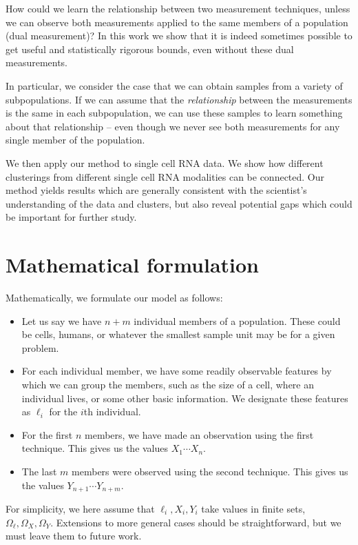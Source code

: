 How could we learn the relationship between two measurement techniques, unless we can observe both measurements 
applied to the same members of a population (dual measurement)?  In this work we show that it is indeed 
sometimes possible to get useful and statistically rigorous bounds, even without these dual measurements.   

In particular, we consider the case that we can obtain samples from a variety of subpopulations.  
If we can assume that the \emph{relationship} between the measurements is the same in each subpopulation, 
we can use these samples to learn something about that relationship -- even though we never see both 
measurements for any single member of the population.  

We then apply our method to single cell RNA data.  We show how different clusterings from different single 
cell RNA modalities can be connected.  Our method yields results which are generally consistent with the scientist's
understanding of the data and clusters, but also reveal potential gaps which could be important for further study.

\section{Mathematical formulation}

Mathematically, we formulate our model as follows:

\begin{itemize}
\item Let us say we have $n+m$ individual members of a population.  These could be cells, humans, or whatever
the smallest sample unit may be for a given problem.
\item For each individual member, we have some readily observable features by which we can group the members,
such as the size of a cell, where an individual lives, or some other basic information.  We designate these
features as $\ell_i$ for the $i$th individual.
\item For the first $n$ members, we have made an observation using the first technique.  This gives us
the values $X_1 \cdots X_n$.
\item The last $m$ members were observed using the second technique.  This gives us the values
$Y_{n+1} \cdots Y_{n+m}$.
\end{itemize}

For simplicity, we here assume that $\ell_i,X_i,Y_i$ take values in finite sets, $\Omega_\ell,\Omega_X,\Omega_Y$.  Extensions to more general
cases should be straightforward, but we must leave them to future work.  


